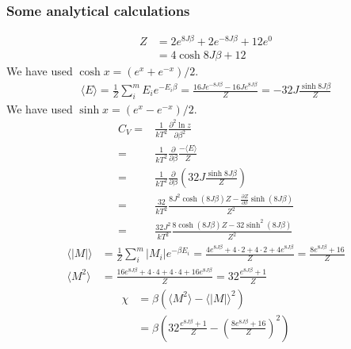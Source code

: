 \documentclass[%
 reprint,
nofootinbib,
aps,
]{revtex4-1}
\begin{document}
\subsubsection{Some analytical calculations}
\begin{align*}
    Z &= 2e^{8J\beta} + 2e^{-8J\beta} + 12e^0 \\
    &= 4\cosh{8J\beta} + 12
\end{align*}
We have used $\cosh{x} = (e^x + e^{-x})/2$. \\
\begin{align*}
    \langle E \rangle = \frac{1}{Z}\sum_i^m E_ie^{-E_i\beta} = \frac{16Je^{-8J\beta} - 16Je^{8J\beta}}{Z} = -32J\frac{\sinh{8J\beta}}{Z}
\end{align*}
We have used $\sinh{x} = (e^x - e^{-x})/2$. \\
\begin{align*}
    C_V =& \frac{1}{kT^2}\frac{\partial^2\ln{z}}{\partial \beta^2} \\
     =& \frac{1}{kT^2}\frac{\partial}{\partial \beta}\frac{-\langle E \rangle}{Z} \\
    =& \frac{1}{kT^2}\frac{\partial}{\partial \beta}(32J\frac{\sinh{8J\beta}}{Z}) \\
    =&  \frac{32}{kT^2}\frac{8J^2\cosh{(8J\beta)}Z - \frac{\partial Z}{\partial \beta}\sinh{(8J\beta)}}{Z^2} \\
    =&  \frac{32J^2}{kT^2}\frac{8\cosh{(8J\beta)}Z -32\sinh^2{(8J\beta)}}{Z^2}
\end{align*}
\begin{align*}
    \langle|M|\rangle &= \frac{1}{Z}\sum_i^m |M_i|e^{-\beta E_i} = \frac{4e^{8J\beta} + 4\cdot2 + 4\cdot2 + 4e^{8J\beta}}{Z} = \frac{8e^{8J\beta} + 16}{Z} \\
 \langle M^2 \rangle &= \frac{16e^{8J\beta} + 4\cdot4 + 4\cdot4 + 16e^{8J\beta}}{Z} = 32\frac{e^{8J\beta} + 1}{Z}
\end{align*}
\begin{align*}
    \chi &= \beta\left(\langle M^2 \rangle - \langle |M| \rangle^2\right) \\
    &= \beta\left(32\frac{e^{8J\beta} + 1}{Z} - (\frac{8e^{8J\beta} + 16}{Z})^2\right) 
\end{align*}
\end{document}
